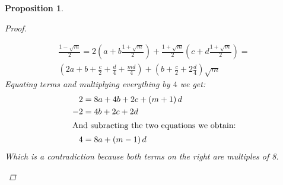 \documentclass[11pt]{article}
\newtheorem{prop}{Proposition}
\theoremstyle{definition}
\begin{document}
\begin{prop}
\begin{proof}
\begin{itemize}
\begin{gather*}
                    \frac{1 - \sqrt {m}}{2} = 2\left(a+b\frac{1 + \sqrt {m}}{2}\right) + \frac{1 + \sqrt {m}}{2}\left(c+d\frac{1 + \sqrt {m}}{2}\right) = \\
                    \left(2a + b +  \frac{c}{2} + \frac{d}{4} + \frac{md}{4} \right) + \left(b + \frac{c}{2} + 2\frac{d}{4} \right) \sqrt {m}
                \end{gather*}
                Equating terms and multiplying everything by $4$ we get:
                \begin{align*}
                    2 &= 8a + 4b + 2c + (m+1)\,d  \\
                    -2 &= 4b + 2c + 2d \\
                    \intertext{And subracting the two equations we obtain:}
                    4 &= 8a + (m-1)\,d
                \end{align*}
                Which is a contradiction because both terms on the right are multiples of 8.


            \end{itemize}


        \end{proof}
    \end{prop}
\end{document}
